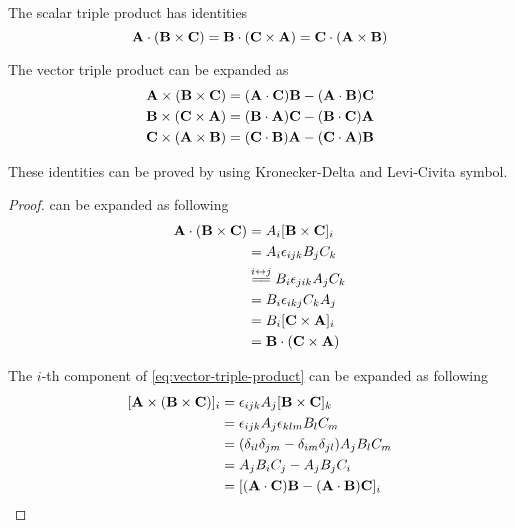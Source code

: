 \begin{property}
The scalar triple product has identities
\begin{equation}
\label{eq:scalar-triple-product}
\mathbf{A}\cdot (\mathbf{B}\times\mathbf{C}) = \mathbf{B}\cdot (\mathbf{C}\times\mathbf{A}) = \mathbf{C}\cdot (\mathbf{A}\times\mathbf{B})
\end{equation}

The vector triple product can be expanded as
\begin{equation}
\label{eq:vector-triple-product}
\begin{split}
\mathbf{A}\times (\mathbf{B}\times\mathbf{C}) &= (\mathbf{A}\cdot\mathbf{C})\mathbf{B} -(\mathbf{A}\cdot\mathbf{B})\mathbf{C} \\
\mathbf{B}\times (\mathbf{C}\times\mathbf{A}) &= (\mathbf{B}\cdot\mathbf{A})\mathbf{C} -(\mathbf{B}\cdot\mathbf{C})\mathbf{A} \\
\mathbf{C}\times (\mathbf{A}\times\mathbf{B}) &= (\mathbf{C}\cdot\mathbf{B})\mathbf{A} -(\mathbf{C}\cdot\mathbf{A})\mathbf{B}
\end{split}
\end{equation}
\end{property}

These identities can be proved by using Kronecker-Delta and Levi-Civita symbol.
\begin{proof}
 can be expanded as following
\begin{equation*}
\begin{split}
\A\cdot (\B\times\C) &= A_i [\B\times\C]_i \\
&= A_i \epsilon_{ijk} B_j C_k \\
&\stackrel{i\leftrightarrow j}{=\joinrel=} B_i \epsilon_{jik} A_j C_k \\
&= B_i \epsilon_{ikj} C_k A_j \\
&= B_i [\C\times\A]_i \\
&= \B\cdot (\C\times\A)
\end{split}
\end{equation*}

The $i$-th component of \cref{eq:vector-triple-product} can be expanded as following
\begin{equation*}
\begin{split}
[\mathbf{A}\times(\mathbf{B}\times\mathbf{C})]_i &= \epsilon_{ijk} A_j [\mathbf{B}\times\mathbf{C}]_k \\
&= \epsilon_{ijk} A_j \epsilon_{klm} B_l C_m \\
&= (\delta_{il}\delta_{jm} - \delta_{im}\delta_{jl}) A_j B_l C_m \\
&= A_j B_i C_j - A_j B_j C_i \\
&= [(\mathbf{A}\cdot\mathbf{C})\mathbf{B} - (\mathbf{A}\cdot\mathbf{B})\mathbf{C}]_i \qedhere
\end{split}
\end{equation*}
\end{proof}

